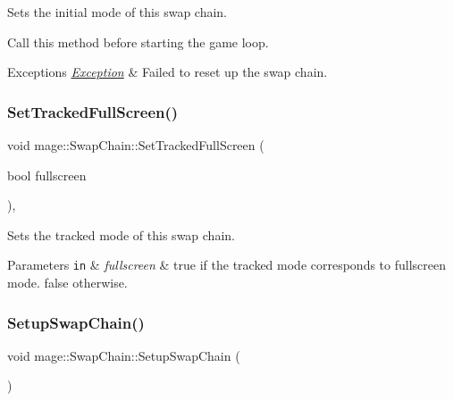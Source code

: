 Sets the initial mode of this swap chain.

Call this method before starting the game loop.


\begin{DoxyExceptions}{Exceptions}
{\em \hyperlink{classmage_1_1_exception}{Exception}} & Failed to reset up the swap chain. \\
\hline
\end{DoxyExceptions}
\hypertarget{classmage_1_1_swap_chain_ae2689c07632f1fdc8367c9eefd62851b}{}\label{classmage_1_1_swap_chain_ae2689c07632f1fdc8367c9eefd62851b} 
\subsubsection{\texorpdfstring{Set\+Tracked\+Full\+Screen()}{SetTrackedFullScreen()}}
{\footnotesize\ttfamily void mage\+::\+Swap\+Chain\+::\+Set\+Tracked\+Full\+Screen (\begin{DoxyParamCaption}\item[{bool}]{fullscreen }\end{DoxyParamCaption})\hspace{0.3cm}{\ttfamily [private]}, {\ttfamily [noexcept]}}

Sets the tracked mode of this swap chain.


\begin{DoxyParams}[1]{Parameters}
\mbox{\tt in}  & {\em fullscreen} & {\ttfamily true} if the tracked mode corresponds to fullscreen mode. {\ttfamily false} otherwise. \\
\hline
\end{DoxyParams}
\hypertarget{classmage_1_1_swap_chain_aec2b14bc569046174f6a416a7f20c8d5}{}\label{classmage_1_1_swap_chain_aec2b14bc569046174f6a416a7f20c8d5} 
\subsubsection{\texorpdfstring{Setup\+Swap\+Chain()}{SetupSwapChain()}}
{\footnotesize\ttfamily void mage\+::\+Swap\+Chain\+::\+Setup\+Swap\+Chain (\begin{DoxyParamCaption}{ }\end{DoxyParamCaption})\hspace{0.3cm}{\ttfamily [private]}}

